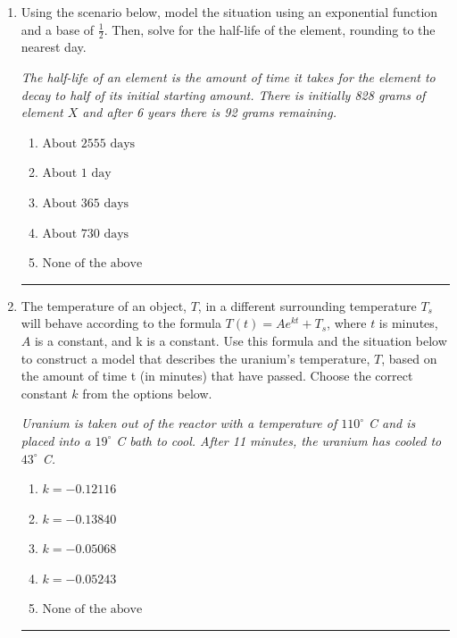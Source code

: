 \documentclass[14pt]{extbook}
\newcommand{\litem}[1]{\item#1\hspace*{-1cm}\rule{\textwidth}{0.4pt}}
\begin{document}
\begin{enumerate}
{\begin{enumerate}[label=\Alph*.]
\end{enumerate} }
\litem{
Using the scenario below, model the situation using an exponential function and a base of $\frac{1}{2}$. Then, solve for the half-life of the element, rounding to the nearest day.
\begin{center}
    \textit{ The half-life of an element is the amount of time it takes for the element to decay to half of its initial starting amount. There is initially 828 grams of element $X$ and after 6 years there is 92 grams remaining. }
\end{center}
\begin{enumerate}[label=\Alph*.]
\item \( \text{About } 2555 \text{ days} \)
\item \( \text{About } 1 \text{ day} \)
\item \( \text{About } 365 \text{ days} \)
\item \( \text{About } 730 \text{ days} \)
\item \( \text{None of the above} \)

\end{enumerate} }
\litem{
The temperature of an object, $T$, in a different surrounding temperature $T_s$ will behave according to the formula $T(t) = Ae^{kt} + T_s$, where $t$ is minutes, $A$ is a constant, and k is a constant. Use this formula and the situation below to construct a model that describes the uranium's temperature, $T$, based on the amount of time t (in minutes) that have passed. Choose the correct constant $k$ from the options below.
\begin{center}
    \textit{ Uranium is taken out of the reactor with a temperature of $110^{\circ}$ C and is placed into a $19^{\circ}$ C bath to cool. After 11 minutes, the uranium has cooled to $43^{\circ}$ C. }
\end{center}
\begin{enumerate}[label=\Alph*.]
\item \( k = -0.12116 \)
\item \( k = -0.13840 \)
\item \( k = -0.05068 \)
\item \( k = -0.05243 \)
\item \( \text{None of the above} \)


\end{enumerate}}
\end{enumerate}
\end{document}
